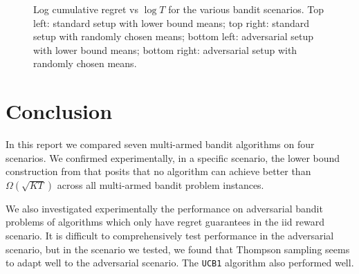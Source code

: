 \documentclass[10pt]{article}
\begin{document}
\begin{figure}[!ht]
\begin{tabular}{cc}
    \end{tabular}
    \caption{Log cumulative regret vs $\log T$ for the various bandit scenarios.
    Top left: standard setup with lower bound means; top right: standard setup
    with randomly chosen means; bottom left: adversarial setup with lower bound
    means; bottom right: adversarial setup with randomly chosen means.}
    \label{figure-graphs}
\end{figure}

\section{Conclusion}
In this report we compared seven multi-armed bandit algorithms on four
scenarios. We confirmed experimentally, in a specific scenario, the lower bound
construction from \cite{Slivkins} that posits that no algorithm can achieve
better than $\Omega(\sqrt{KT})$ across all multi-armed bandit problem instances.

We also investigated experimentally the performance on adversarial bandit
problems of algorithms which only have regret guarantees in the iid reward
scenario. It is difficult to comprehensively test performance in the adversarial
scenario, but in the scenario we tested, we found that Thompson sampling seems
to adapt well to the adversarial scenario. The \verb'UCB1' algorithm also
performed well.



\end{document}
